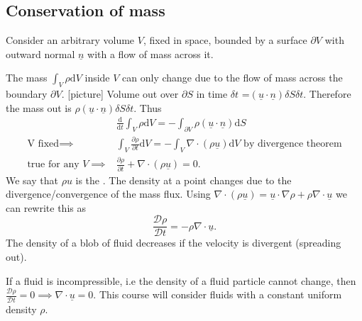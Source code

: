 \documentclass[egregdoesnotlikesansseriftitles,a4paper]{scrartcl}
\renewcommand{\vec}[1]{\underline{#1}}
\begin{document}
\subsection{Conservation of mass}
Consider an arbitrary volume $V$, fixed in space, bounded by a surface $\partial V$ with outward normal $\vec{n}$ with a flow of mass across it.

The mass $\int_{V}^{}\rho  \mathrm{d}V $ inside $V$ can only change due to the flow of mass across the boundary $\partial V$.
[picture]
Volume out over $\partial S$ in time $\delta t$ =$(\vec{u}\cdot \vec{n})\delta S \delta t$. Therefore the mass out is $\rho(\vec{u}\cdot \vec{n})\delta S \delta t$. Thus
\begin{align*}
    &\frac{\mathrm{d}}{\mathrm{d}t} \int_{V}^{}\rho \mathrm{d}V =- \int_{\partial V}^{}\rho (\vec{u}\cdot \vec{n}) \mathrm{d}S\\
    \text{V fixed} \implies & \int_{V}^{}\frac{\partial \rho}{\partial t} \mathrm{d} V=-\int_{V}^{}\nabla \cdot (\rho \vec{u}) \mathrm{d}V \text{ by divergence theorem}\\ 
    \text{true for any } V \implies & \frac{\partial \rho}{\partial t} +\nabla \cdot (\rho \vec{u})=0.
\end{align*}
We say that $\rho u$ is the . The density at a point changes due to the divergence/convergence of the mass flux. Using $\nabla \cdot (\rho \vec{u})= \vec{u}\cdot \nabla \rho + \rho \nabla \cdot \vec{u}$ we can rewrite this as \[
\frac{\mathcal{D}\rho}{\mathcal{D}t}=-\rho \nabla \cdot \vec{u}
.\] The density of a blob of fluid decreases if the velocity is divergent (spreading out). 

If a fluid is incompressible, i.e the density of a fluid particle cannot change, then $\frac{\mathcal{D}\rho}{\mathcal{D}t}= 0 \implies \nabla \cdot \vec{u} =0$. This course will consider fluids with a constant uniform density $\rho$. 
\end{document}
